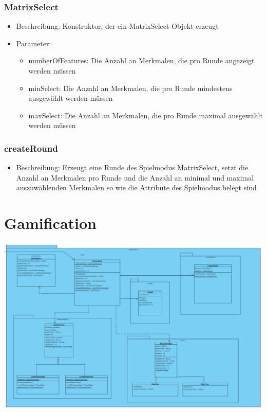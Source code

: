 \documentclass[a4paper]{scrreprt}
\begin{document}
	\subsubsection{MatrixSelect}
		\begin{itemize}
		\item Beschreibung: Konstruktor, der ein MatrixSelect-Objekt erzeugt
		\item Parameter:
		\begin{itemize}
		\item numberOfFeatures: Die Anzahl an Merkmalen, die pro Runde angezeigt werden müssen
		\item minSelect: Die Anzahl an Merkmalen, die pro Runde mindestens ausgewählt werden müssen
		\item maxSelect: Die Anzahl an Merkmalen, die pro Runde maximal ausgewählt werden müssen
		\end{itemize}
		\end{itemize}
	\subsubsection{createRound}
	\begin{itemize}
		\item Beschreibung: Erzeugt eine Runde des Spielmodus MatrixSelect, setzt die Anzahl an Merkmalen pro Runde und die Anzahl an minimal und maximal auszuwählenden Merkmalen so wie die Attribute des Spielmodus belegt sind
	\end{itemize}


	\section{Gamification}
	\includegraphics[width=\textwidth]{img/Gamification.PNG} \\
\end{document}
